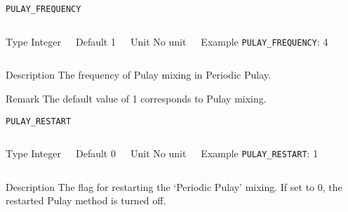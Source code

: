 \documentclass[xcolor=dvipsnames,t]{beamer}
\begin{document}
\begin{frame}[allowframebreaks]{\texttt{PULAY\_FREQUENCY}} \label{PULAY_FREQUENCY}
\vspace*{-12pt}
\begin{columns}
\begin{block}{Type}
Integer
\end{block}

\begin{block}{Default}
1
\end{block}

\begin{block}{Unit}
No unit
\end{block}

\begin{block}{Example}
\texttt{PULAY\_FREQUENCY}: 4
\end{block}
\end{columns}

\begin{block}{Description}
The frequency of Pulay mixing in Periodic Pulay. 
\end{block}

\begin{block}{Remark}
The default value of 1 corresponds to Pulay mixing.
\end{block}

\end{frame}




\begin{frame}[allowframebreaks]{\texttt{PULAY\_RESTART}} \label{PULAY_RESTART}
\vspace*{-12pt}
\begin{columns}
\begin{block}{Type}
Integer
\end{block}

\begin{block}{Default}
0
\end{block}

\begin{block}{Unit}
No unit
\end{block}

\begin{block}{Example}
\texttt{PULAY\_RESTART}: 1
\end{block}
\end{columns}

\begin{block}{Description}
The flag for restarting the `Periodic Pulay' mixing. If set to 0, the restarted Pulay method is turned off.
\end{block}

\end{frame}
\end{document}
